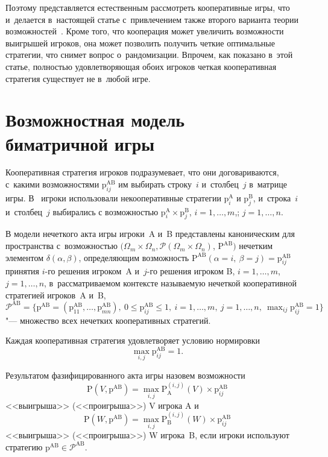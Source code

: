 \documentclass[twoside]{article}
\begin{document}
Поэтому представляется естественным рассмотреть кооперативные игры, что и~делается в~настоящей
статье с~привлечением также второго варианта теории возможностей~\cite{book}. Кроме того, что
кооперация может увеличить возможности выигрышей игроков, она может позволить получить четкие
оптимальные стратегии, что снимет вопрос о~рандомизации. Впрочем, как показано в~этой статье,
полностью удовлетворяющая обоих игроков четкая кооперативная стратегия существует не в~любой игре.
\section{Возможностная модель\\ биматричной игры}
Кооперативная стратегия игроков подразумевает, что они договариваются, с~какими возможностями
$\mathrm{p}^\mathrm{AB}_{ij}$ им выбирать строку~$i$ и~столбец~$j$ в~матрице игры. В~\cite{article}
игроки использовали некооперативные стратегии $\mathrm p^\mathrm A_i$ и $\mathrm p^\mathrm B_j$,
и~строка~$i$ и~столбец~$j$ выбирались с возможностью $\mathrm p^\mathrm{A}_i{\times}\mathrm
p^\mathrm B_j$, $i=1,\ldots,m$,; $j=1,\ldots,n$.
\begin{Definition}
В модели нечеткого акта игры игроки~A и~B представлены каноническим для прост\-ранс\-тва
с~возможностью $(\Omega_m{\times}\Omega_n,\mathcal{P}(\Omega_m{\times}\Omega_n)$,
$\mathrm{P}^{\mathrm{AB}})$ нечетким элементом $\delta(\alpha,\beta)${\rm,} определяющим
возможность $\mathrm{P}^{\mathrm{AB}}(\alpha=i,\ \beta=j)=\mathrm{p}^{\mathrm{AB}}_{ij}$ принятия
$i$-го решения игроком~A и~$j$-го решения игроком B{\rm,} $i=1,\ldots,m$,\; $j=1,\ldots,n$,
в~рассматриваемом контексте называемую нечеткой кооперативной стратегией игроков~A и~B{\rm,}
$\mathcal{P}^{\mathrm{AB}}=\{\mathrm{p}^{\mathrm{AB}}=(\mathrm{p}^{\mathrm{AB}}_{11},\ldots,
\mathrm{p}^{\mathrm{AB}}_{mn}),\ 0\le\mathrm{p}^{\mathrm{AB}}_{ij}\le1,\ i=1,\ldots,m,\
j=1,\ldots,n,\  \max_{ij}\mathrm{p}^{\mathrm{AB}}_{ij}=1\}$ "--- множество всех нечетких
кооперативных стратегий.

Каждая кооперативная стратегия удовлетворяет условию нормировки
    \begin{equation}\label{norm}
\max_{i,j}\mathrm{p}^{\mathrm{AB}}_{ij}=1.
    \end{equation}

Результатом фазифицированного акта игры назовем возможности
    \[
\mathrm{P}(V,\mathrm{p}^\mathrm{AB})=\max_{i,j}\mathrm{P}_\mathrm{A}^{(i,j)}(V)\times\mathrm{p}^\mathrm{AB}_{ij}
    \]
<<выигрыша>> (<<проигрыша>>) V игрока A и
    \[
\mathrm{P}(W,\mathrm{p}^\mathrm{AB})=\max_{i,j}\mathrm{P}_\mathrm{B}^{(i,j)}(W)\times\mathrm{p}^\mathrm{AB}_{ij}
    \]
<<выигрыша>> (<<проигрыша>>) W игрока~B{\rm,} если игроки используют
стратегию $\mathrm{p}^\mathrm{AB}\in\mathcal{P}^\mathrm{AB}$.
\end{Definition}
\end{document}

